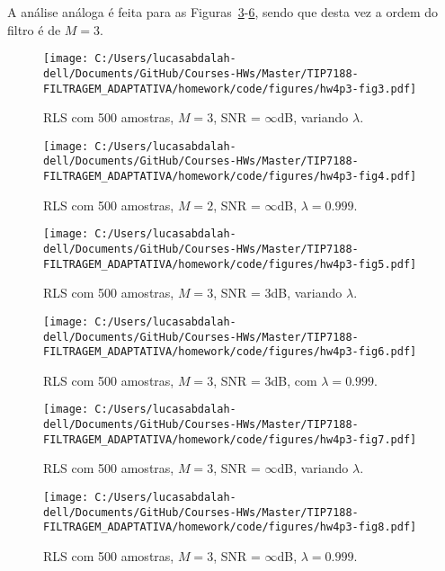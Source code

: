 A análise análoga é feita para as Figuras~\ref{fig:hw4p3-fig5}-\ref{fig:hw4p3-fig8}, sendo que desta vez a ordem do filtro é de $M=3$.

\begin{figure}[!htp]
    \centering
    \texttt{[image: C:/Users/lucasabdalah-dell/Documents/GitHub/Courses-HWs/Master/TIP7188-FILTRAGEM\_ADAPTATIVA/homework/code/figures/hw4p3-fig3.pdf]}
    \caption{RLS com 500 amostras, $M=3$, SNR = $\infty$dB, variando $\lambda$.}
    \label{fig:hw4p3-fig3}
\end{figure}


\begin{figure}[!htp]
    \centering
    \texttt{[image: C:/Users/lucasabdalah-dell/Documents/GitHub/Courses-HWs/Master/TIP7188-FILTRAGEM\_ADAPTATIVA/homework/code/figures/hw4p3-fig4.pdf]}
    \caption{RLS com 500 amostras, $M=2$, SNR = $\infty$dB, $\lambda = 0.999$.}
    \label{fig:hw4p3-fig4}
\end{figure}

\begin{figure}[!htp]
    \centering
    \texttt{[image: C:/Users/lucasabdalah-dell/Documents/GitHub/Courses-HWs/Master/TIP7188-FILTRAGEM\_ADAPTATIVA/homework/code/figures/hw4p3-fig5.pdf]}
    \caption{RLS com 500 amostras, $M=3$, SNR = 3dB, variando $\lambda$.}
    \label{fig:hw4p3-fig5}
\end{figure}

\begin{figure}[!htp]
    \centering
    \texttt{[image: C:/Users/lucasabdalah-dell/Documents/GitHub/Courses-HWs/Master/TIP7188-FILTRAGEM\_ADAPTATIVA/homework/code/figures/hw4p3-fig6.pdf]}
    \caption{RLS com 500 amostras, $M=3$, SNR = 3dB, com $\lambda = 0.999$.}
    \label{fig:hw4p3-fig6}
\end{figure}

\begin{figure}[!htp]
    \centering
    \texttt{[image: C:/Users/lucasabdalah-dell/Documents/GitHub/Courses-HWs/Master/TIP7188-FILTRAGEM\_ADAPTATIVA/homework/code/figures/hw4p3-fig7.pdf]}
    \caption{RLS com 500 amostras, $M=3$, SNR = $\infty$dB, variando $\lambda$.}
    \label{fig:hw4p3-fig7}
\end{figure}

\begin{figure}[!htp]
    \centering
    \texttt{[image: C:/Users/lucasabdalah-dell/Documents/GitHub/Courses-HWs/Master/TIP7188-FILTRAGEM\_ADAPTATIVA/homework/code/figures/hw4p3-fig8.pdf]}
    \caption{RLS com 500 amostras, $M=3$, SNR = $\infty$dB, $\lambda = 0.999$.}
    \label{fig:hw4p3-fig8}
\end{figure}

